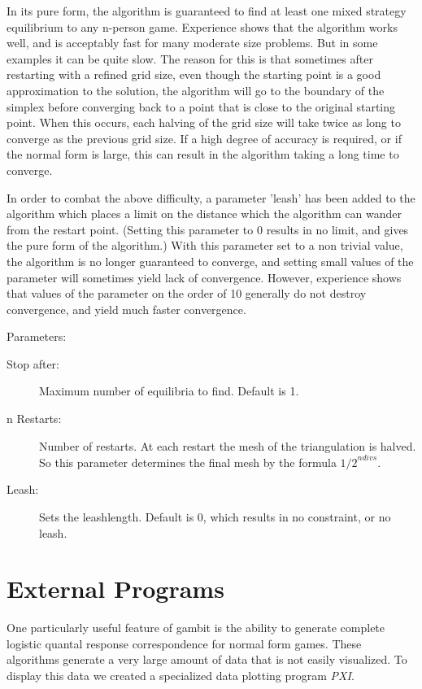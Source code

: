 \documentclass[12pt]{report}
\begin{document}
In its pure form, the algorithm is guaranteed to find at least one
mixed strategy equilibrium to any n-person game.  Experience shows
that the algorithm works well, and is acceptably fast for many
moderate size problems.  But in some examples it can be quite slow.
The reason for this is that sometimes after restarting with a refined
grid size, even though the starting point is a good approximation to
the solution, the algorithm will go to the boundary of the simplex
before converging back to a point that is close to the original
starting point.  When this occurs, each halving of the grid size will
take twice as long to converge as the previous grid size.  If a high
degree of accuracy is required, or if the normal form is large, this
can result in the algorithm taking a long time to converge.

In order to combat the above difficulty, a parameter 'leash' has been
added to the algorithm which places a limit on the distance which the
algorithm can wander from the restart point. (Setting this parameter
to 0 results in no limit, and gives the pure form of the algorithm.)
With this parameter set to a non trivial value, the algorithm is no
longer guaranteed to converge, and setting small values of the
parameter will sometimes yield lack of convergence.  However,
experience shows that values of the parameter on the order of 10
generally do not destroy convergence, and yield much faster
convergence.

Parameters:

\begin{description}
\item[Stop after:] Maximum number of equilibria to find. Default is 1.  
\item[n Restarts:] Number of restarts.  At each restart the mesh of the
triangulation is halved.  So this parameter determines the final mesh
by the formula ${1/2}^{ndivs}$.
\item[Leash:] Sets the leashlength. Default is 0, which results in no
constraint, or no leash.  
\end{description}

\chapter{External Programs}
One particularly useful feature of gambit is the ability to generate complete 
logistic quantal response correspondence for normal form games.  These
algorithms generate a very large amount of data that is not easily visualized.
To display this data we created a specialized data plotting program {\em PXI}.
\end{document}
